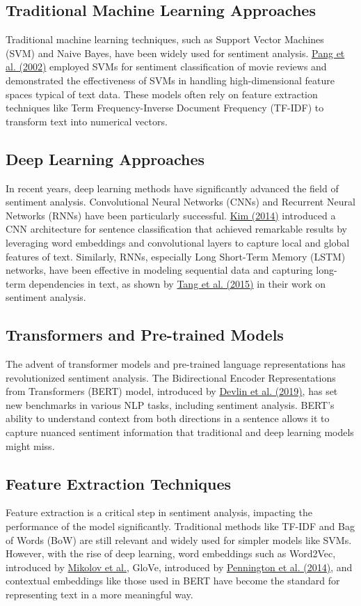 \documentclass[12pt]{article}
\begin{document}
\subsection{Traditional Machine Learning Approaches}
Traditional machine learning techniques, such as Support Vector Machines (SVM) and Naive Bayes, have been widely used for sentiment analysis. \href{https://www.cs.cornell.edu/home/llee/papers/sentiment.pdf}{Pang et al. (2002)} employed SVMs for sentiment classification of movie reviews and demonstrated the effectiveness of SVMs in handling high-dimensional feature spaces typical of text data. These models often rely on feature extraction techniques like Term Frequency-Inverse Document Frequency (TF-IDF) to transform text into numerical vectors.

\subsection{Deep Learning Approaches}
In recent years, deep learning methods have significantly advanced the field of sentiment analysis. Convolutional Neural Networks (CNNs) and Recurrent Neural Networks (RNNs) have been particularly successful. \href{https://arxiv.org/abs/1408.5882}{Kim (2014)} introduced a CNN architecture for sentence classification that achieved remarkable results by leveraging word embeddings and convolutional layers to capture local and global features of text. Similarly, RNNs, especially Long Short-Term Memory (LSTM) networks, have been effective in modeling sequential data and capturing long-term dependencies in text, as shown by \href{https://www.aclweb.org/anthology/P15-1067/}{Tang et al. (2015)} in their work on sentiment analysis.

\subsection{Transformers and Pre-trained Models}
The advent of transformer models and pre-trained language representations has revolutionized sentiment analysis. The Bidirectional Encoder Representations from Transformers (BERT) model, introduced by \href{https://arxiv.org/abs/1810.04805}{Devlin et al. (2019)}, has set new benchmarks in various NLP tasks, including sentiment analysis. BERT's ability to understand context from both directions in a sentence allows it to capture nuanced sentiment information that traditional and deep learning models might miss.

\subsection{Feature Extraction Techniques}
Feature extraction is a critical step in sentiment analysis, impacting the performance of the model significantly. Traditional methods like TF-IDF and Bag of Words (BoW) are still relevant and widely used for simpler models like SVMs. However, with the rise of deep learning, word embeddings such as Word2Vec, introduced by \href{https://arxiv.org/abs/1301.3781}{Mikolov et al.}, GloVe, introduced by \href{https://nlp.stanford.edu/pubs/glove.pdf}{Pennington et al. (2014)}, and contextual embeddings like those used in BERT have become the standard for representing text in a more meaningful way.
\end{document}
